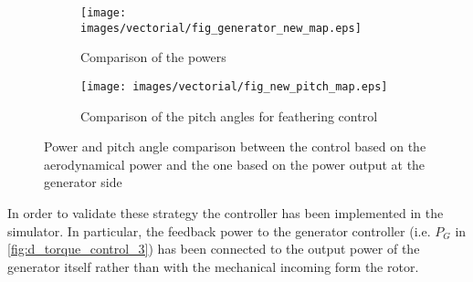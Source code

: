 \begin{figure}[htb]
  \begin{subfigure}{0.5\textwidth}
    \centering
    \texttt{[image: images/vectorial/fig\_generator\_new\_map.eps]}
    \caption{Comparison of the powers}
    \label{fig:fig_generator_new_map}
  \end{subfigure}
  \begin{subfigure}{0.5\textwidth}
    \centering
    \texttt{[image: images/vectorial/fig\_new\_pitch\_map.eps]}
    \caption{Comparison of the pitch angles for feathering control}
    \label{fig:fig_new_pitch_map}
\end{subfigure}
  \caption{Power and pitch angle comparison between the control based on the aerodynamical power and the one based on the power output at the generator side}
  \label{fig:fig_blade_control_gen_side}
\end{figure}
In order to validate these strategy the controller has been implemented in the simulator. In particular, the feedback power to the generator controller (i.e. $P_G$ in \autoref{fig:d_torque_control_3}) has been connected to the output power of the generator itself rather than with the mechanical incoming form the rotor.

